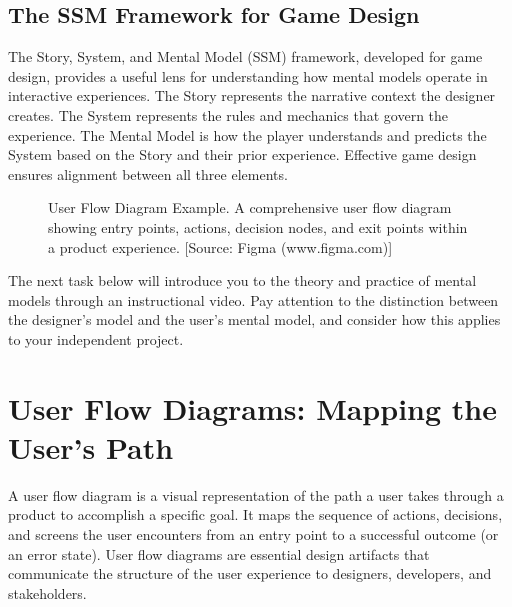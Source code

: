 \documentclass[12pt,a4paper]{article}
\begin{document}
\subsection*{The SSM Framework for Game Design}
The Story, System, and Mental Model (SSM) framework, developed for game design, provides a useful lens for understanding how mental models operate in interactive experiences. The Story represents the narrative context the designer creates. The System represents the rules and mechanics that govern the experience. The Mental Model is how the player understands and predicts the System based on the Story and their prior experience. Effective game design ensures alignment between all three elements.

\begin{figure}[h!]
    \centering
    \caption{User Flow Diagram Example. A comprehensive user flow diagram showing entry points, actions, decision nodes, and exit points within a product experience. [Source: Figma (www.figma.com)]}
\end{figure}

The next task below will introduce you to the theory and practice of mental models through an instructional video. Pay attention to the distinction between the designer’s model and the user’s mental model, and consider how this applies to your independent project.

\section*{User Flow Diagrams: Mapping the User’s Path}
A user flow diagram is a visual representation of the path a user takes through a product to accomplish a specific goal. It maps the sequence of actions, decisions, and screens the user encounters from an entry point to a successful outcome (or an error state). User flow diagrams are essential design artifacts that communicate the structure of the user experience to designers, developers, and stakeholders.
\end{document}

